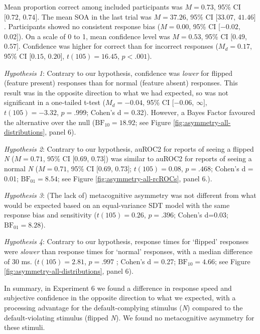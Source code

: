 \documentclass[12pt,twoside]{reedthesis}
\begin{document}
Mean proportion correct among included participants was \(M = 0.73\), 95\% CI \([0.72\), \(0.74]\). The mean SOA in the last trial was \(M = 37.26\), 95\% CI \([33.07\), \(41.46]\). Participants showed no consistent response bias (\(M = 0.00\), 95\% CI \([-0.02\), \(0.02]\)). On a scale of 0 to 1, mean confidence level was \(M = 0.53\), 95\% CI \([0.49\), \(0.57]\). Confidence was higher for correct than for incorrect responses (\(M_d = 0.17\), 95\% CI \([0.15\), \(0.20]\), \(t(105) = 16.45\), \(p < .001\)).

\emph{Hypothesis 1}: Contrary to our hypothesis, confidence was \emph{lower} for flipped (feature present) responses than for normal (feature absent) responses. This result was in the opposite direction to what we had expected, so was not significant in a one-tailed t-test (\(M_d = -0.04\), 95\% CI \([-0.06\), \(\infty]\), \(t(105) = -3.32\), \(p = .999\); Cohen's d = 0.32). However, a Bayes Factor favoured the alternative over the null (\(\mathrm{BF}_{\textrm{10}} = 18.92\); see Figure \ref{fig:asymmetry-all-distributions}, panel 6).

\emph{Hypothesis 2}: Contrary to our hypothesis, auROC2 for reports of seeing a flipped \emph{N} (\(M = 0.71\), 95\% CI \([0.69\), \(0.73]\)) was similar to auROC2 for reports of seeing a normal \emph{N} (\(M = 0.71\), 95\% CI \([0.69\), \(0.73]\); \(t(105) = 0.08\), \(p = .468\); Cohen's d = 0.01; \(\mathrm{BF}_{\textrm{01}} = 8.54\); see Figure \ref{fig:asymmetry-all-rcROCs}, panel 6.).

\emph{Hypothesis 3}: (The lack of) metacognitive asymmetry was not different from what would be expected based on an equal-variance SDT model with the same response bias and sensitivity (\(t(105) = 0.26\), \(p = .396\); Cohen's d=0.03; \(\mathrm{BF}_{\textrm{01}} = 8.28\)).

\emph{Hypothesis 4}: Contrary to our hypothesis, response times for `flipped' responses were \emph{slower} than response times for `normal' responses, with a median difference of 30 ms. (\(t(105) = 2.81\), \(p = .997\) ; Cohen's d = 0.27; \(\mathrm{BF}_{\textrm{10}} = 4.66\); see Figure \ref{fig:asymmetry-all-distributions}, panel 6).

In summary, in Experiment 6 we found a difference in response speed and subjective confidence in the opposite direction to what we expected, with a processing advantage for the default-complying stimulus (\emph{N}) compared to the default-violating stimulus (flipped \emph{N}). We found no metacognitive asymmetry for these stimuli.
\end{document}
